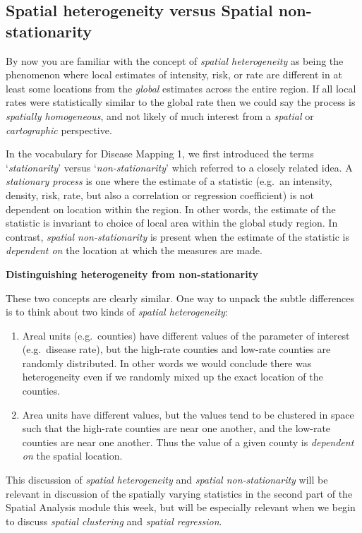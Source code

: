 \documentclass[
]{book}
\providecommand{\tightlist}{%
  \setlength{\itemsep}{0pt}\setlength{\parskip}{0pt}}
\newenvironment{rmdnote}[1]
  {
  \begin{itemize}
  \renewcommand{\labelitemi}{
    \raisebox{-.7\height}[0pt][0pt]{
      {\setkeys{Gin}{width=3em,keepaspectratio}\texttt{[image: images/\#1]}}
    }
  }
  \setlength{\fboxsep}{1em}
  \begin{note}
  \item
  }
  {
  \end{note}
  \end{itemize}
  }
\begin{document}
\hypertarget{spatial-heterogeneity-versus-spatial-non-stationarity}{%
\subsection{Spatial heterogeneity versus Spatial non-stationarity}\label{spatial-heterogeneity-versus-spatial-non-stationarity}}

By now you are familiar with the concept of \emph{spatial heterogeneity} as being the phenomenon where local estimates of intensity, risk, or rate are different in at least some locations from the \emph{global} estimates across the entire region. If all local rates were statistically similar to the global rate then we could say the process is \emph{spatially homogeneous}, and not likely of much interest from a \emph{spatial} or \emph{cartographic} perspective.

In the vocabulary for Disease Mapping 1, we first introduced the terms `\emph{stationarity}' versus `\emph{non-stationarity}' which referred to a closely related idea. A \emph{stationary process} is one where the estimate of a statistic (e.g.~an intensity, density, risk, rate, but also a correlation or regression coefficient) is not dependent on location within the region. In other words, the estimate of the statistic is invariant to choice of local area within the global study region. In contrast, \emph{spatial non-stationarity} is present when the estimate of the statistic is \emph{dependent on} the location at which the measures are made.

\begin{rmdnote}{note}
\textbf{Distinguishing heterogeneity from non-stationarity}

These two concepts are clearly similar. One way to unpack the subtle differences is to think about two kinds of \emph{spatial heterogeneity}:

\begin{enumerate}
\def\labelenumi{\arabic{enumi}.}
\tightlist
\item
  Areal units (e.g.~counties) have different values of the parameter of interest (e.g.~disease rate), but the high-rate counties and low-rate counties are randomly distributed. In other words we would conclude there was heterogeneity even if we randomly mixed up the exact location of the counties.
\item
  Area units have different values, but the values tend to be clustered in space such that the high-rate counties are near one another, and the low-rate counties are near one another. Thus the value of a given county is \emph{dependent on} the spatial location.
\end{enumerate}

This discussion of \emph{spatial heterogeneity} and \emph{spatial non-stationarity} will be relevant in discussion of the spatially varying statistics in the second part of the Spatial Analysis module this week, but will be especially relevant when we begin to discuss \emph{spatial clustering} and \emph{spatial regression}.

\end{rmdnote}
\end{document}
